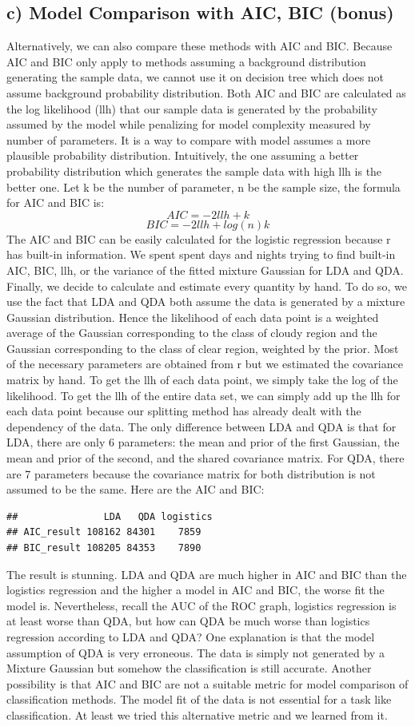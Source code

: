 \documentclass[jou]{apa}%
\begin{document}
\subsection{c) Model Comparison with AIC, BIC (bonus)}
Alternatively, we can also compare these methods with AIC and BIC. Because AIC and BIC only apply to methods assuming a background distribution generating the sample data, we cannot use it on decision tree which does not assume background probability distribution. Both AIC and BIC are calculated as the log likelihood (llh) that our sample data is generated by the probability assumed by the model while penalizing for model complexity measured by number of parameters. It is a way to compare with model assumes a more plausible probability distribution. Intuitively, the one assuming a better probability distribution which generates the sample data with high llh is the better one. Let k be the number of parameter, n be the sample size, the formula for AIC and BIC is: 
$$AIC = -2llh + k$$ $$BIC = -2llh + log(n)k$$
The AIC and BIC can be easily calculated for the logistic regression because r has built-in information. We spent spent days and nights trying to find built-in AIC, BIC, llh, or the variance of the fitted mixture Gaussian for LDA and QDA. Finally, we decide to calculate and estimate every quantity by hand. To do so, we use the fact that LDA and QDA both assume the data is generated by a mixture Gaussian distribution. Hence the likelihood of each data point is a weighted average of the Gaussian corresponding to the class of cloudy region and the Gaussian corresponding to the class of clear region, weighted by the prior. Most of the necessary parameters are obtained from r but we estimated the covariance matrix by hand. To get the llh of each data point, we simply take the log of the likelihood. To get the llh of the entire data set, we can simply add up the llh for each data point because our splitting method has already dealt with the dependency of the data. The only difference between LDA and QDA is that for LDA, there are only 6 parameters: the mean and prior of the first Gaussian, the mean and prior of the second, and the shared covariance matrix. For QDA, there are 7 parameters because the covariance matrix for both distribution is not assumed to be the same. Here are the AIC and BIC:
\begin{verbatim}
##               LDA   QDA logistics
## AIC_result 108162 84301    7859
## BIC_result 108205 84353    7890
\end{verbatim}
The result is stunning. LDA and QDA are much higher in AIC and BIC than the logistics regression and the higher a model in AIC and BIC, the worse fit the model is. Nevertheless, recall the AUC of the ROC graph, logistics regression is at least worse than QDA, but how can QDA be much worse than logistics regression according to LDA and QDA? One explanation is that the model assumption of QDA is very erroneous. The data is simply not generated by a Mixture Gaussian but somehow the classification is still accurate. Another possibility is that AIC and BIC are not a suitable metric for model comparison of classification methods. The model fit of the data is not essential for a task like classification. At least we tried this alternative metric and we learned from it.
\end{document}
